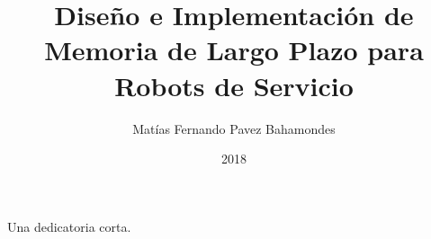 \documentclass[upright, contnum]{umemoria}
\author{Matías Fernando Pavez Bahamondes}
\title{Diseño e Implementación de Memoria de Largo Plazo para Robots de Servicio}
\date{2018}
\begin{document}
\frontmatter
\maketitle

\begin{abstract}
\lipsum[1-2]
\end{abstract}

\begin{dedicatoria}
Una dedicatoria corta.
\end{dedicatoria}

\begin{thanks}
\lipsum[1-2]
\end{thanks}

\cleardoublepage
\tableofcontents
\cleardoublepage
\listoftables
\cleardoublepage
\listoffigures

\mainmatter






\nocite{*}


\end{document}
